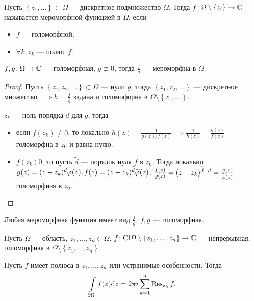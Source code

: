 \begin{definition}
    Пусть $\left\{ z_1, \ldots \right\} \subset \Omega$ --- дискретное подмножество $\Omega$. Тогда  $f\!: \Omega \setminus \left\{ z_i \right\} \to \mathbb{C}$ называется мероморфной функцией в $\Omega$, если
     \begin{itemize}
        \item $f$ --- голоморфной,
        \item  $\forall k, z_k$ --- полюс  $f$.
    \end{itemize}
\end{definition}
\begin{lemma}
    $f, g\!: \Omega \to \mathbb{C}$ --- голоморфная,  $g \not \equiv 0$, тогда  $\frac{f}{g}$ --- мероморфна в $\Omega$.
\end{lemma}
\begin{proof}
    Пусть $\left\{ z_1, z_2, \ldots \right\} \subset \Omega$ --- нули $g$, тогда  $\left\{ z_1, z_2, \ldots \right\}$ --- дискретное множество $\implies h = \frac{f}{g}$ задана и голомофорна в $\Omega \setminus \left\{ z_1, \ldots \right\} $.

    $z_k$ --- ноль порядка $d$ для  $g$, тогда
    \begin{itemize}
        \item если $f(z_k) \neq 0$, то локально $h(z) = \frac{1}{g(z) / f(z)} \implies \frac{1}{h(z)} = \frac{g\left(z  \right)}{f(z)}$ голоморфна в $z_0$ и равна нулю.
        \item $f(z_k)  0$, то пусть  $\widetilde{d}$ --- порядок нуля  $f$ в  $z_k$. Тогда локально  $g(z) = (z-z_k)^{d} \varphi(z), f(z) = (z-z_k)^{\widetilde{d}} \widetilde{\varphi}(z)$. $\frac{f(z)}{g(z)} = (z-z_k)^{\widetilde{d} - d} = \frac{\varphi(z)}{\widetilde{\varphi}(z)}$ --- голоморфная в $z_0$.
    \end{itemize}
\end{proof}
\begin{theorem}
    Любая мероморфная функция имеет вид $\frac{f}{g}$, $f, g$ --- голоморфная.
\end{theorem}
\begin{theorem}
    Пусть $\Omega$ --- область,  $z_1, \ldots, z_n \in \Omega$. $f\!: \operatorname{Cl} \Omega \setminus \left\{ z_1, \ldots, z_n \right\} \to \mathbb{C}$ --- непрерывная, голоморфная в $\Omega \setminus \left\{ z_1, \ldots, z_n \right\}$.

    Пусть $f$ имеет полюса в  $z_1, \ldots ,z_n$ или устранимые особенности. Тогда
    \[
        \int\limits_{\partial \Omega} f(z) \mathrm{d}z = 2 \pi i \sum\limits_{k=1}^n \operatorname{Res}_{z_k}f
    .\] 
\end{theorem}
